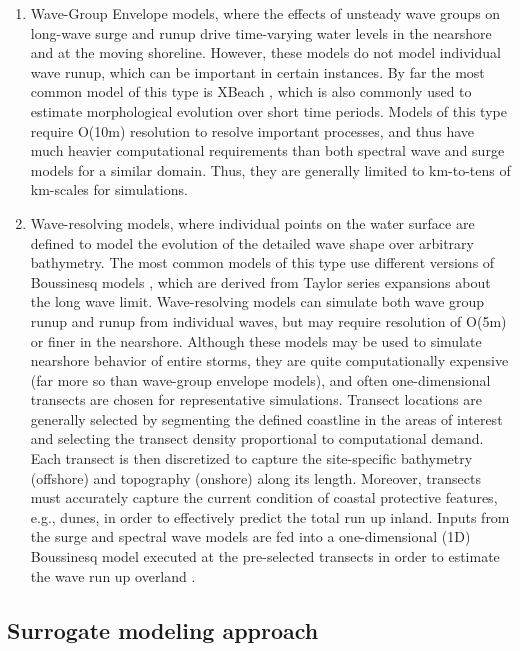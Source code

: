 \begin{enumerate}
    \item Wave-Group Envelope models, where the effects of unsteady wave groups on long-wave surge and runup drive time-varying water levels in the nearshore and at the moving shoreline. However, these models do not model individual wave runup, which can be important in certain instances. By far the most common model of this type is XBeach \citep{roelvink2009a}, which is also commonly used to estimate morphological evolution over short time periods. Models of this type require O(10m) resolution to resolve important processes, and thus have much heavier computational requirements than both spectral wave and surge models for a similar domain. Thus, they are generally limited to km-to-tens of km-scales for simulations. 
    \item Wave-resolving models, where individual points on the water surface are defined to model the evolution of the detailed wave shape over arbitrary bathymetry. The most common models of this type use different versions of Boussinesq models \citep{lynett2002modeling,kennedy2000a,nwogu2010a}, which are derived from Taylor series expansions about the long wave limit. Wave-resolving models can simulate both wave group runup and runup from individual waves, but may require resolution of O(5m) or finer in the nearshore. Although these models may be used to simulate nearshore behavior of entire storms, they are quite computationally expensive (far more so than wave-group envelope models), and often one-dimensional transects are chosen for representative simulations. Transect locations are generally selected by segmenting the defined coastline in the areas of interest and selecting the transect density proportional to computational demand. Each transect is then discretized to capture the site-specific bathymetry (offshore) and topography (onshore) along its length. Moreover, transects must accurately capture the current condition of coastal protective features, e.g., dunes, in order to effectively predict the total run up inland. Inputs from the surge and spectral wave models are fed into a one-dimensional (1D) Boussinesq model executed at the pre-selected transects in order to estimate the wave run up overland \citep{demirbilek2009a}. 
\end{enumerate}

\subsection{Surrogate modeling approach}

